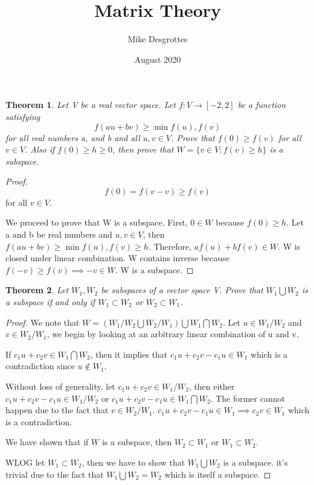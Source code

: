 \documentclass{article}
\title{Matrix Theory}
\author{Mike Desgrottes}
\date{August 2020}
\theoremstyle{plain}
\newtheorem{theorem}{Theorem}
\theoremstyle{definition}
\begin{document}
\maketitle

\section{}
\begin{theorem}
Let V be a real vector space. Let $f: V \to [-2,2]$ be a function satisfying $$ f(au + bv) \geq \min{f(u), f(v)} $$ for all real numbers a, and b and all $u,v \in V$. Prove that $f(0) \geq f(v)$ for all $v \in V$. Also if $f(0) \geq h \geq 0$, then prove that $W = \{v \in V: f(v) \geq h \}$ is a subspace. 
 \end{theorem}
\begin{proof}
 $$f(0) = f(v - v) \geq f(v) $$ for all $v \in V$. 

 We proceed to prove that W is a subspace. First, $0 \in W$ because $f(0) \geq h$. Let a and b be real numbers and $u,v \in V$, then $f(au + bv) \geq \min{f(u),f(v)} \geq h$. Therefore, $af(u) + bf(v) \in W$. W is closed under linear combination. W contains inverse because $f(-v) \geq f(v) \implies -v \in W$. W is a subspace. 
\end{proof}
 
 \begin{theorem}
 	Let $W_{1},W_{2}$ be subspaces of a vector space V. Prove that $W_{1} \bigcup W_{2}$ is a subspace if and only if $W_{1} \subset W_{2}$ or $W_{2} \subset W_{1}$.
 \end{theorem}

\begin{proof}
	We note that $W = (W_{1}/W_{2} \bigcup W_{2}/W_{1}) \bigcup W_{1} \bigcap W_{2}$. Let $u \in W_{1}/W_{2}$ and $v \in W_{2}/W_{1}$, we begin by looking at an arbitrary linear combination of u and v. 

	If $c_{1}u + c_{2}v \in W_{1} \bigcap W_{2}$, then it implies that $c_{1}u + c_{2}v - c_{1}u \in W_{1} $ which is a contradiction since $u \not \in W_{1}$.  

	Without loss of generality, let $c_{1}u + c_{2}v \in W_{1}/W_{2}$, then either $c_{1}u + c_{2}v - c_{1}u \in W_{1}/W_{2}$ or $c_{1}u + c_{2}v - c_{1}u \in W_{1} \bigcap W_{2}$. The former cannot happen due to the fact that $v \in W_{2}/W_{1}$. $c_{1}u + c_{2}v - c_{1}u \in W_{1} \implies c_{2}v \in W_{1}$ which is a contradiction. 

	We have shown that if $W$ is a subspace, then $W_{2} \subset W_{1}$ or $W_{1} \subset W_{2}$.
	
	WLOG let $W_{1} \subset W_{2}$, then we have to show that $W_{1} \bigcup W_{2}$ is a subspace. it's trivial due to the fact that $W_{1} \bigcup W_{2} = W_{2}$ which is itself a subspace. 
\end{proof}
\end{document}
